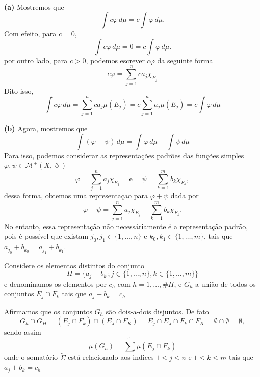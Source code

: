 \documentclass[a4paper, 11pt]{book}
\theoremstyle{definition}
\newcommand{\cM}{\mathcal{M}}
\begin{document}
\begin{prf}
    ~

    \textbf{(a)} Mostremos que
    \[
        \int c \varphi \, d\mu = c \int \varphi \, d\mu.
    \]
    Com efeito, para $c = 0$,
    \[
        \int c \varphi \, d\mu = 0 = c \int \varphi \, d\mu.
    \]
    por outro lado, para $c > 0$, podemos escrever $c\varphi$ da seguinte forma
    \[
        c\varphi = \sum_{j = 1}^{n} ca_j \chi_{E_j}
    \]
    Dito isso,
    \[
        \int c \varphi \, d\mu = \sum_{j = 1}^{n} ca_j \mu(E_j) = c\sum_{j = 1}^{n} a_j \mu(E_j) = c\int \varphi \, d\mu
    \]

    \textbf{(b)} Agora, mostremos que 
    \[
        \int (\varphi + \psi) \, d\mu = \int \varphi \,d\mu + \int \psi \, d\mu
    \]
    Para isso, podemos considerar as representações padrões das funções simples $\varphi, \psi \in \cM^+(X,\eth)$
    \[
        \varphi = \sum_{j = 1}^{n} a_j \chi_{E_j} \quad \text{ e } \quad \psi = \sum_{k = 1}^{m} b_k \chi_{F_k},
    \]
    dessa forma, obtemos uma representaçao para $\varphi + \psi$ dada por
    \[
        \varphi + \psi = \sum_{j = 1}^{n} a_j \chi_{E_j} + \sum_{k = 1}^{m} b_k \chi_{F_k}.
    \]
    No entanto, essa representação não necessáriamente é a representação padrão, pois é possível que existam $j_0, j_1 \in \{1,\dots,n\}$ e $k_0, k_1 \in \{1,\dots,m\}$, tais que $a_{j_0} + b_{k_0} = a_{j_1} + b_{k_1}$.

    Considere os elementos distintos do conjunto
    \[
        H = \{a_j + b_k \,; j \in \{1,\dots,n\}, k \in \{1,\dots,m\}\}
    \]
    e denominamos os elementos por $c_h$ com $h = 1,\dots,\# H$, e $G_h$ a união de todos os conjuntos $E_j \cap F_k$ tais que $a_j + b_k = c_h$

    Afirmamos que os conjuntos $G_h$ são dois-a-dois disjuntos. De fato
    \[
        G_h \cap G_H = (E_j \cap F_k) \cap (E_J \cap F_K) = E_j \cap E_J \cap F_k \cap F_K = \emptyset \cap \emptyset = \emptyset,
    \]
    sendo assim
    \[
        \mu(G_h) = \widetilde{\sum} \mu(E_j \cap F_k)
    \]
    onde o somatório $\widetilde{\Sigma}$ está relacionado aos indices $1 \leqslant j \leqslant n$ e $1 \leqslant k \leqslant m$ tais que $a_j + b_k = c_h$


\end{prf}
\end{document}
